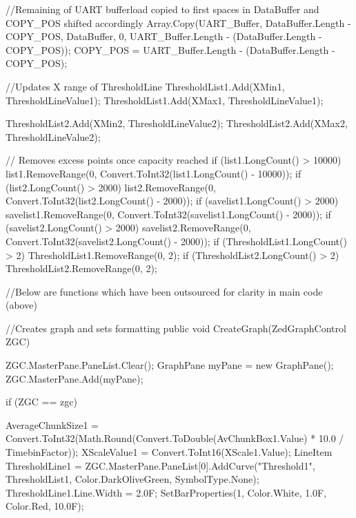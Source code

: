 {{{{{{                        //Remaining of UART bufferload copied to first spaces in DataBuffer and COPY_POS shifted accordingly
                        Array.Copy(UART_Buffer, DataBuffer.Length - COPY_POS, DataBuffer, 0, UART_Buffer.Length - (DataBuffer.Length - COPY_POS));
                        COPY_POS = UART_Buffer.Length - (DataBuffer.Length - COPY_POS);

                    }
                }
            }
            //Updates X range of ThresholdLine
            ThresholdList1.Add(XMin1, ThresholdLineValue1);
            ThresholdList1.Add(XMax1, ThresholdLineValue1);

            ThresholdList2.Add(XMin2, ThresholdLineValue2);
            ThresholdList2.Add(XMax2, ThresholdLineValue2);
            
            // Removes excess points once capacity reached
            if (list1.LongCount() > 10000)
            {
                list1.RemoveRange(0, Convert.ToInt32(list1.LongCount() - 10000));
            }
            if (list2.LongCount() > 2000)
            {
                list2.RemoveRange(0, Convert.ToInt32(list2.LongCount() - 2000));
            }
            if (savelist1.LongCount() > 2000)
            {
                savelist1.RemoveRange(0, Convert.ToInt32(savelist1.LongCount() - 2000));
            }
            if (savelist2.LongCount() > 2000)
            {
                savelist2.RemoveRange(0, Convert.ToInt32(savelist2.LongCount() - 2000));
            }
            if (ThresholdList1.LongCount() > 2)
            {
                ThresholdList1.RemoveRange(0, 2);
            }
            if (ThresholdList2.LongCount() > 2)
            {
                ThresholdList2.RemoveRange(0, 2);
            }

        }

        //Below are functions which have been outsourced for clarity in main code (above)
        
        //Creates graph and sets formatting
        public void CreateGraph(ZedGraphControl ZGC)
        {
            ZGC.MasterPane.PaneList.Clear();
            GraphPane myPane = new GraphPane();
            ZGC.MasterPane.Add(myPane);

            if (ZGC == zgc)
            {
                AverageChunkSize1 = Convert.ToInt32(Math.Round(Convert.ToDouble(AvChunkBox1.Value) * 10.0 / TimebinFactor));
                XScaleValue1 = Convert.ToInt16(XScale1.Value);
                LineItem ThresholdLine1 = ZGC.MasterPane.PaneList[0].AddCurve("Threshold1", ThresholdList1, Color.DarkOliveGreen, SymbolType.None);
                ThresholdLine1.Line.Width = 2.0F;
                SetBarProperties(1, Color.White, 1.0F, Color.Red, 10.0F);

}}}}
